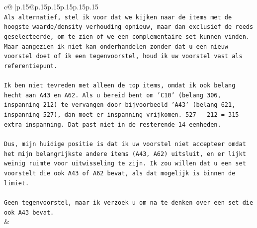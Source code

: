 \documentclass{article}
\begin{document}
{\begin{supertabular}{c@{$\;$}|p{.15\linewidth}@{}p{.15\linewidth}p{.15\linewidth}p{.15\linewidth}p{.15\linewidth}p{.15\linewidth}}
{{{\\ 
\texttt{Als alternatief, stel ik voor dat we kijken naar de items met de hoogste waarde/density verhouding opnieuw, maar dan exclusief de reeds geselecteerde, om te zien of we een complementaire set kunnen vinden. Maar aangezien ik niet kan onderhandelen zonder dat u een nieuw voorstel doet of ik een tegenvoorstel, houd ik uw voorstel vast als referentiepunt.} \\
\\ 
\texttt{Ik ben niet tevreden met alleen de top items, omdat ik ook belang hecht aan A43 en A62. Als u bereid bent om 'C10' (belang 306, inspanning 212) te vervangen door bijvoorbeeld 'A43' (belang 621, inspanning 527), dan moet er inspanning vrijkomen. 527 {-} 212 = 315 extra inspanning. Dat past niet in de resterende 14 eenheden.} \\
\\ 
\texttt{Dus, mijn huidige positie is dat ik uw voorstel niet accepteer omdat het mijn belangrijkste andere items (A43, A62) uitsluit, en er lijkt weinig ruimte voor uitwisseling te zijn. Ik zou willen dat u een set voorstelt die ook A43 of A62 bevat, als dat mogelijk is binnen de limiet.} \\
\\ 
\texttt{Geen tegenvoorstel, maar ik verzoek u om na te denken over een set die ook A43 bevat.} \\
            }
        }
    }
    & \\ \\


\end{supertabular}}
\end{document}
